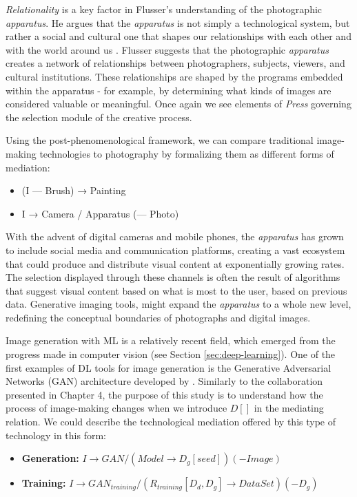 \emph{Relationality} is a key factor in Flusser's understanding of the photographic \textit{apparatus}. He argues that the \textit{apparatus} is not simply a technological system, but rather a social and cultural one that shapes our relationships with each other and with the world around us \citep{Flusser2000}. Flusser suggests that the photographic \textit{apparatus} creates a network of relationships between photographers, subjects, viewers, and cultural institutions. These relationships are shaped by the programs embedded within the apparatus - for example, by determining what kinds of images are considered valuable or meaningful. Once again we see elements of \emph{Press} governing the selection module of the creative process.

Using the post-phenomenological framework, we can compare traditional image-making technologies to photography by formalizing them as different forms of mediation:
\begin{itemize}
	\singlespacing
	\item (I --- Brush) → Painting
	\item I → Camera / Apparatus (--- Photo)
\end{itemize}
With the advent of digital cameras and mobile phones, the \textit{apparatus} has grown to include social media and communication platforms, creating a vast ecosystem that could produce and distribute visual content at exponentially growing rates. The selection displayed through these channels is often the result of algorithms that suggest visual content based on what is most  to the user, based on previous data. Generative imaging tools, might expand the \emph{apparatus} to a whole new level, redefining the conceptual boundaries of photographs and digital images. 

Image generation with ML is a relatively recent field, which emerged from the progress made in computer vision (see Section \ref{sec:deep-learning}). One of the first examples of DL tools for image generation is the Generative Adversarial Networks (GAN) architecture developed by \cite{Goodfellow2014}.  Similarly to the collaboration presented in Chapter 4, the purpose of this study is to understand how the process of image-making changes when we introduce $D[]$ in the mediating relation. We could describe the technological mediation offered by this type of technology in this form:

\begin{itemize}
	\singlespacing
	\item \textbf{Generation:} $ I \rightarrow GAN / (Model \rightarrow D_g[seed]) (- Image) $
	\item \textbf{Training:} $ I \rightarrow GAN_{training} / (R_{training}[D_d,D_g] \rightarrow DataSet) (- D_g) $
\end{itemize}


